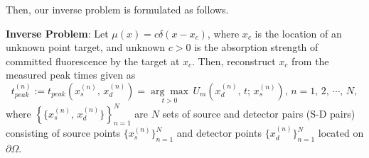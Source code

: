 \documentclass[10pt]{article}
\numberwithin{equation}{section}
\numberwithin{figure}{section}
\begin{document}
Then, our inverse problem is formulated as follows.

\noindent
\textbf{Inverse Problem}: Let $\mu(x)= c\delta(x-x_c)$,
where $x_c$ is the location of an unknown point target, and unknown $c>0$ is the absorption strength of committed fluorescence by the target at $x_c$.
Then, reconstruct $x_c$ from the measured peak times given as
$$t_{peak}^{(n)}:=t_{peak}(x_s^{(n)},\,x_d^{(n)})=\underset{t>0}{\arg \max}\,U_m(x_d^{(n)},\,t;\,x_s^{(n)}),\,n=1,\,2,\,\cdots,\,N,$$
where  $\left\{\{x_s^{(n)},\,x_d^{(n)}\}\right\}_{n=1}^N$ are $N$ sets of source and detector pairs (S-D pairs) consisting of source points $\{x_s^{(n)}\}_{n=1}^N$ and detector points $\{x_d^{(n)}\}_{n=1}^N$ located on $\partial\Omega$. 

\medskip

\begin{comment}
Now, we briefly review some related works to the mentioned inverse problem, where the peak time is studied or further used to solve the inverse problem. In \cite{Hall2004,Hall2010}, the authors considered the case of $\ell>0$ and $\beta=0$. They reconstructed the depth of the point target by numerically calculating the peak time without giving any of the formulas derived in a mathematically rigorous way. 
In \cite{Chen2023}, the authors of this paper derived the asymptotic behavior of the solution $U_m$ to \eqref{um_sys} and an approximate peak time equation (see \eqref{cubicpoly}) for the case $\ell=0, \; \beta>0$. Moreover, in \cite{Chen2025}, they derived an approximate peak time equation for the case $\ell >0, \; \beta>0$. The derived approximate peak time equations in \cite{Chen2023} and \cite{Chen2025} have shown a nice accuracy to peak time, which led them to propose a bisection algorithm to reconstruct the location of unknown point target. 
\end{comment}
\end{document}
